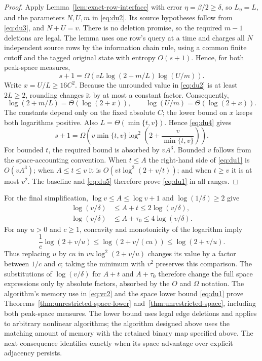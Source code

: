 \documentclass[11pt,letterpaper]{article}
\numberwithin{equation}{section}
\begin{document}
\begin{proof}
Apply Lemma~\ref{lem:exact-row-interface} with error $\eta=\beta/2\ge\delta$, so $L_\eta=L$, and the parameters $N,U,m$ in \eqref{eq:du2}.
Its source hypotheses follow from \eqref{eq:du3}, and $N+U=v$.
There is no deletion promise, so the required $m-1$ deletions are legal.
The lemma uses one row's query at a time and charges all $N$ independent source rows by the information chain rule, using a common finite cutoff and the tagged original state with entropy $O(s+1)$.
Hence, for both peak-space measures,
\begin{equation}
s+1=\Omega\!\left(
 vL\log(2+m/L)\log(U/m)\right).
 \label{eq:du4}
\end{equation}
Write $x=U/L\ge16C^2$.
Because the unrounded value in \eqref{eq:du2} is at least $2L\ge2$, rounding changes it by at most a constant factor.
Consequently,
\[
 \log(2+m/L)=\Theta(\log(2+x)),\qquad
 \log(U/m)=\Theta(\log(2+x)).
\]
The constants depend only on the fixed absolute $C$; the lower bound on $x$ keeps both logarithms positive.
Also $L=\Theta(\min\{t,v\})$.
Hence \eqref{eq:du4} gives
\begin{equation}
s+1=\Omega\!\left(
 v\min\{t,v\}
 \log^2\left(2+\frac{v}{\min\{t,v\}}\right)\right).
 \label{eq:du5}
\end{equation}
For bounded $t$, the required bound is absorbed by $vA^3$.
Bounded $v$ follows from the space-accounting convention.
When $t\le A$ the right-hand side of \eqref{eq:du1} is $O(vA^3)$; when $A\le t\le v$ it is $O(vt\log^2(2+v/t))$; and when $t\ge v$ it is at most $v^2$.
The baseline and \eqref{eq:du5} therefore prove \eqref{eq:du1} in all ranges.
\end{proof}

For the final simplification, $\log v\le A\le\log v+1$ and $\log(1/\delta)\ge2$ give
\[
\begin{aligned}
 \log(v/\delta)&\le A+t\le2\log(v/\delta),\\
 \log(v/\delta)&\le A+\tau_0\le4\log(v/\delta).
\end{aligned}
\]
For any $u>0$ and $c\ge1$, concavity and monotonicity of the logarithm imply
\[
 \frac1c\log(2+v/u)\le\log(2+v/(cu))\le\log(2+v/u).
\]
Thus replacing $u$ by $cu$ in $vu\log^2(2+v/u)$ changes its value by a factor between $1/c$ and $c$; taking the minimum with $v^2$ preserves this comparison.
The substitutions of $\log(v/\delta)$ for $A+t$ and $A+\tau_0$ therefore change the full space expressions only by absolute factors, absorbed by the $O$ and $\Omega$ notation.
The algorithm's memory use in \eqref{eq:vc2} and the space lower bound \eqref{eq:du1} prove Theorems~\ref{thm:unrestricted-space-lower} and~\ref{thm:unrestricted-space}, including both peak-space measures.
The lower bound uses legal edge deletions and applies to arbitrary nonlinear algorithms; the algorithm designed above uses the matching amount of memory with the retained binary map specified above.
The next consequence identifies exactly when its space advantage over explicit adjacency persists.
\end{document}
